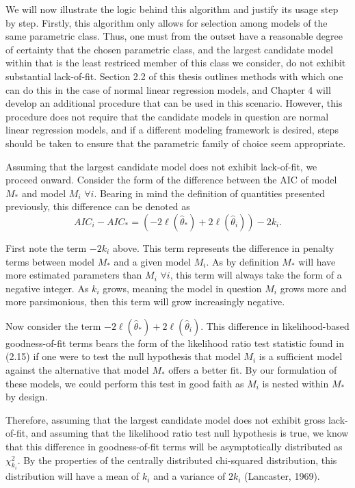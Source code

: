 		We will now illustrate the logic behind this algorithm and justify its usage step by step. Firstly, this algorithm only allows for selection among models of the
		same parametric class. Thus, one must from the outset have a reasonable degree of certainty that the chosen parametric class, and the largest candidate model
		within that is the least restriced member of this class we consider, do not exhibit substantial lack-of-fit. Section 2.2 of this thesis outlines methods with which one can do this in the case of normal linear regression
		models, and Chapter 4 will develop an additional procedure that can be used in this scenario. However, this procedure does not require that the candidate models
		in question are normal linear regression models, and if a different modeling framework is desired, steps should be taken to ensure that the parametric family
		of choice seem appropriate.

		Assuming that the largest candidate model does not exhibit lack-of-fit, we proceed onward. Consider the form of the difference between the AIC of model $M_*$
		and model $M_i$ $\forall i$. Bearing in mind the definition of quantities presented previously, this difference can be denoted as
		\begin{equation}
			AIC_i - AIC_* = \left( -2 \ell (\hat{\theta}_*) + 2 \ell (\hat{\theta}_i) \right) - 2k_i .
		\end{equation}

		First note the term $-2k_i$ above. This term represents the difference in penalty terms between model $M_*$ and a given model $M_i$. As by definition
		$M_*$ will have more estimated parameters than $M_i$ $\forall i$, this term will always take the form of a negative integer. As $k_i$ grows, meaning
		the model in question $M_i$ grows more and more parsimonious, then this term will grow increasingly negative.

		Now consider the term $-2 \ell (\hat{\theta}_*) + 2 \ell (\hat{\theta}_i)$. This difference in likelihood-based goodness-of-fit terms bears the form
		of the likelihood ratio test statistic found in (2.15) if one were to test the null hypothesis that model $M_i$ is a sufficient model against the alternative that
		model $M_*$ offers a better fit. By our formulation of these models, we could perform this test in good faith as $M_i$ is nested within $M_*$ by 
		design.

		Therefore, assuming that the largest candidate model does not exhibit gross lack-of-fit, and assuming that the likelihood ratio test null hypothesis is true, we
		know that this difference in goodness-of-fit terms will be asymptotically distributed as $\chi^2_{k_i}$. By the properties of the centrally distributed chi-squared
		distribution, this distribution will have a mean of $k_i$ and a variance of $2 k_i$ (Lancaster, 1969).

